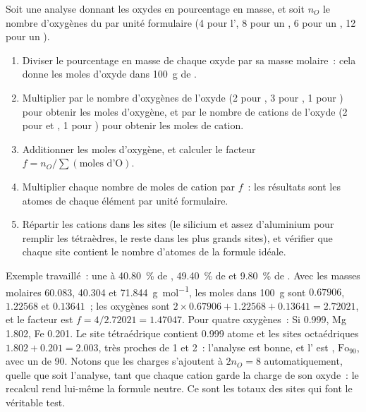 \begin{method}\label{met:b1:rock-forming-minerals:recalculation}
Soit une analyse donnant les oxydes en pourcentage en masse, et soit $n_O$ le
nombre d'oxygènes du  par unité formulaire (4 pour l', 8 pour un
, 6 pour un , 12 pour un ).
\begin{enumerate}
  \item Diviser le pourcentage en masse de chaque oxyde par sa masse molaire~:
        cela donne les moles d'oxyde dans \qty{100}{g} de .
  \item Multiplier par le nombre d'oxygènes de l'oxyde (2 pour , 3
        pour , 1 pour ) pour obtenir les moles d'oxygène, et
        par le nombre de cations de l'oxyde (2 pour  et , 1
        pour ) pour obtenir les moles de cation.
  \item Additionner les moles d'oxygène, et calculer le facteur
        $f = n_O / \sum(\text{moles d'O})$.
  \item Multiplier chaque nombre de moles de cation par $f$~: les résultats sont
        les atomes de chaque élément par unité formulaire.
  \item Répartir les cations dans les sites (le silicium et assez d'aluminium pour
        remplir les tétraèdres, le reste dans les plus grands sites), et vérifier
        que chaque site contient le nombre d'atomes de la formule idéale.
\end{enumerate}
\end{method}

Exemple travaillé~: une  à \qty{40.80}{\percent} de ,
\qty{49.40}{\percent} de  et \qty{9.80}{\percent} de . Avec les
masses molaires \num{60.083}, \num{40.304} et \qty{71.844}{g.mol^{-1}}, les
moles dans \qty{100}{g} sont $0.67906$, $1.22568$ et $0.13641$~; les
oxygènes sont $2\times0.67906 + 1.22568 + 0.13641 = 2.72021$, et le facteur est
$f = 4/2.72021 = 1.47047$. Pour quatre oxygènes~: Si \num{0.999}, Mg \num{1.802},
Fe \num{0.201}. Le site tétraédrique contient \num{0.999} atome et les sites
octaédriques $1.802 + 0.201 = 2.003$, très proches de 1 et 2~: l'analyse est
bonne, et l' est , $\text{Fo}_{90}$,
avec un  de 90. Notons que les charges s'ajoutent à
$2n_O = 8$ automatiquement, quelle que soit l'analyse, tant que chaque cation
garde la charge de son oxyde~: le recalcul rend lui-même la formule neutre. Ce
sont les totaux des sites qui font le véritable test.

